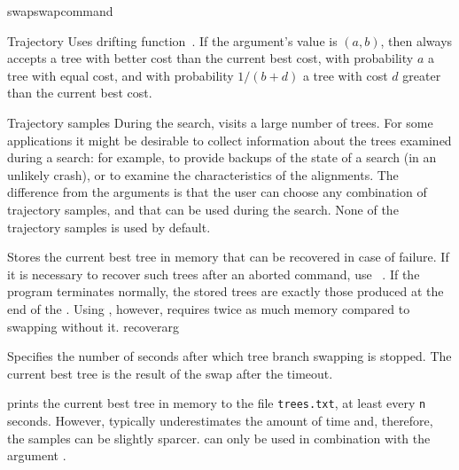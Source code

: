 \begin{command}{swap}{swapcommand}
\begin{arguments}
\begin{argumentgroup}{Trajectory}
                {Uses \poy drifting function~\cite{goloboff1999}. If the argument's value is
                $(a, b)$, then \poy always accepts a tree with better cost than
                the current best cost, with probability $a$ a tree with equal cost,
                and with probability $1 / (b + d)$ a tree with cost $d$ greater
                than the current best cost.}
                {}

	    \end{argumentgroup}

	 \begin{argumentgroup}{Trajectory samples}
	        {During the search, \poy visits a large number of trees. For some
            applications it might be desirable to  collect information about the
            trees examined during a search: for example, to provide backups of
            the state of a search (in an unlikely crash), or to examine the
            characteristics of the alignments.  The difference from the
             arguments is that the user can choose any
            combination of trajectory samples, and that can be used during the
            search. None of the trajectory samples is used by default.}

	            {Stores the current best tree in memory that can be recovered in
                case of failure. If it is necessary to recover such trees after
                an aborted command, use ~.  If the program
                terminates normally, the stored trees are exactly those produced
                at the end of the . Using
                , however, requires twice as much memory
                compared to swapping without it.}
                {recoverarg}

                {Specifies the number of seconds after which tree branch
                swapping is stopped. The current best tree is the result of the
                swap after the timeout.} 
                {}

	            {  prints the current
                best tree in memory to the file \texttt{trees.txt}, at least every 
                \texttt{n} seconds. However, \poy typically underestimates the amount of
                time and, therefore, the samples can be slightly sparcer.  
                can only be used in combination with the argument .}
                {}


\end{argumentgroup}
\end{arguments}
\end{command}
